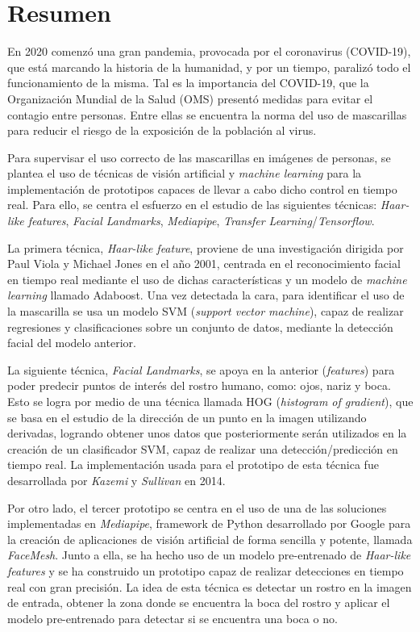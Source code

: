 
\chapter*{Resumen}

En 2020 comenzó una gran pandemia, provocada por el coronavirus (COVID-19), que está marcando la historia de la humanidad, y por un tiempo, paralizó todo el funcionamiento de la misma. Tal es la importancia del COVID-19, que la Organización Mundial de la Salud (OMS) presentó medidas para evitar el contagio entre personas. Entre ellas se encuentra la norma del uso de mascarillas para reducir el riesgo de la exposición de la población al virus. 

Para supervisar el uso correcto de las mascarillas en imágenes de personas, se plantea el uso de técnicas de visión artificial y \textit{machine learning} para la implementación de prototipos capaces de llevar a cabo dicho control en tiempo real. Para ello, se centra el esfuerzo en el estudio de las siguientes técnicas: \textit{Haar-like features}, \textit{Facial Landmarks}, \textit{Mediapipe}, \textit{Transfer Learning}/\textit{Tensorflow}. 

La primera técnica, \textit{Haar-like feature}, proviene de una investigación dirigida por Paul Viola y Michael Jones en el año 2001, centrada en el reconocimiento facial en tiempo real mediante el uso de dichas características y un modelo de \textit{machine learning} llamado Adaboost. Una vez detectada la cara, para identificar el uso de la mascarilla se usa un modelo SVM (\textit{support vector machine}), capaz de realizar regresiones y clasificaciones sobre un conjunto de datos, mediante la detección facial del modelo anterior.

La siguiente técnica, \textit{Facial Landmarks}, se apoya en la anterior (\textit{features}) para poder predecir puntos de interés del rostro humano, como: ojos, nariz y boca. Esto se logra por medio de una técnica llamada HOG (\textit{histogram of gradient}), que se basa en el estudio de la dirección de un punto en la imagen utilizando derivadas, logrando obtener unos datos que posteriormente serán utilizados en la creación de un clasificador SVM, capaz de realizar una detección/predicción en tiempo real. La implementación usada para el prototipo de esta técnica fue desarrollada por \textit{Kazemi} y \textit{Sullivan} en 2014.

Por otro lado, el tercer prototipo se centra en el uso de una de las soluciones implementadas en \textit{Mediapipe}, framework de Python desarrollado por Google para la creación de aplicaciones de visión artificial de forma sencilla y potente, llamada \textit{FaceMesh}. Junto a ella, se ha hecho uso de un modelo pre-entrenado de \textit{Haar-like features} y se ha construido un prototipo capaz de realizar detecciones en tiempo real con gran precisión. La idea de esta técnica es detectar un rostro en la imagen de entrada, obtener la zona donde se encuentra la boca del rostro y aplicar el modelo pre-entrenado para detectar si se encuentra una boca o no.

